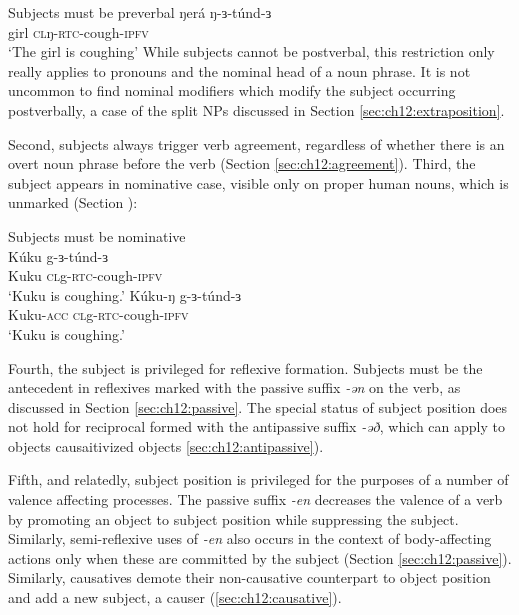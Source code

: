 \ea Subjects must be preverbal \label{ex:ch12:1}
\ea \gll ŋerá ŋ-ɜ-túnd-ɜ\\
girl \textsc{cl}ŋ-\textsc{rtc}-cough-\textsc{ipfv}\\
\glt `The girl is coughing'
\z 
\z 
While subjects cannot be postverbal, this restriction only really applies to pronouns and the nominal head of a noun phrase. It is not uncommon to find nominal modifiers which modify the subject occurring postverbally, a case of the split NPs discussed in Section \ref{sec:ch12:extraposition}.

Second, subjects always trigger verb agreement, regardless of whether there is an overt noun phrase before the verb (Section \ref{sec:ch12:agreement}). Third, the subject appears in nominative case, visible only on proper human nouns, which is unmarked (Section \label{ex:ch12:2}):

\ea Subjects must be nominative \label{ex:ch12:2}\\
\ea \gll Kúku g-ɜ-túnd-ɜ\\
Kuku \textsc{cl}g-\textsc{rtc}-cough-\textsc{ipfv}\\
\glt `Kuku is coughing.'
\ex \gll *Kúku-ŋ g-ɜ-túnd-ɜ\\
Kuku-\textsc{acc} \textsc{cl}g-\textsc{rtc}-cough-\textsc{ipfv}\\
\glt `Kuku is coughing.'
\z 
\z 

Fourth, the subject is privileged for reflexive formation. Subjects must be the antecedent in reflexives marked with the passive suffix \textit{-ən} on the verb, as discussed in Section \ref{sec:ch12:passive}. The special status of subject position does not hold for reciprocal formed with the antipassive suffix \textit{-əð}, which can apply to objects causaitivized objects  \ref{sec:ch12:antipassive}).

Fifth, and relatedly, subject position is privileged for the purposes of a number of valence affecting processes. The passive suffix \textit{-en} decreases the valence of a verb by promoting an object to subject position while suppressing the subject. Similarly, semi-reflexive uses of \textit{-en} also occurs in the context of body-affecting actions only when these are committed by the subject (Section \ref{sec:ch12:passive}). Similarly, causatives demote their non-causative counterpart to object position and add a new subject, a causer (\ref{sec:ch12:causative}).

